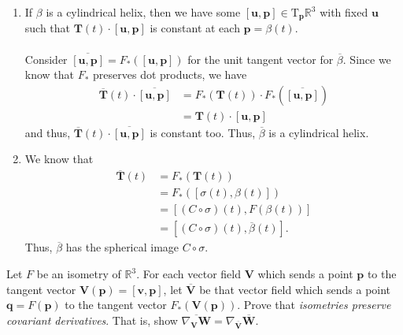\documentclass[12 pt, letterpaper]{hmcpset}
\begin{document}
\begin{solution}
	\begin{enumerate}
		\item If $\beta$ is a cylindrical helix, then we have some $[\mathbf{u}, \mathbf{p}] \in \mathrm{T}_{\mathbf{p}}\mathbb{R}^{3}$ with fixed $\mathbf{u}$ such that $\mathbf{T}(t) \cdot [\mathbf{u}, \mathbf{p}]$ is constant at each $\mathbf{p} = \beta(t)$. \\\\
			Consider $\overline{[\mathbf{u}, \mathbf{p}]} = F_{*}([\mathbf{u}, \mathbf{p}])$ for the unit tangent vector for $\overline{\beta}$. Since we know that $F_{*}$ preserves dot products, we have
			\[
				\begin{split}
					\overline{\mathbf{T}}(t) \cdot \overline{[\mathbf{u}, \mathbf{p}]} & = F_{*}(\mathbf{T}(t)) \cdot F_{*}(\overline{[\mathbf{u}, \mathbf{p}]}) \\
													   & = \mathbf{T}(t) \cdot [\mathbf{u}, \mathbf{p}]
				\end{split}
			\]
			and thus, $\overline{\mathbf{T}}(t) \cdot \overline{[\mathbf{u}, \mathbf{p}]}$ is constant too. Thus, $\overline{\beta}$ is a cylindrical helix.
		\item We know that
			\[
				\begin{split}
					\overline{\mathbf{T}}(t) & = F_{*}(\mathbf{T}(t)) \\
								 & = F_{*}([\sigma(t), \beta(t)]) \\
								 & = [(C \circ \sigma)(t), F(\beta(t))] \\
								 & = [(C \circ \sigma)(t), \overline{\beta}(t)].
				\end{split}
			\]
			Thus, $\overline{\beta}$ has the spherical image $C \circ \sigma$.
	\end{enumerate}
\end{solution}

\pagebreak

\begin{problem}[Problem 5.]
	Let $F$ be an isometry of $\mathbb{R}^{3}$. For each vector field $\mathbf{V}$ which sends a point $\mathbf{p}$ to the tangent vector $\mathbf{V}(\mathbf{p}) = [\mathbf{v}, \mathbf{p}]$, let $\overline{\mathbf{V}}$ be that vector field which sends a point $\mathbf{q} = F(\mathbf{p})$ to the tangent vector $F_{*}(\mathbf{V}(\mathbf{p}))$. Prove that \textit{isometries preserve covariant derivatives}. That is, show $\overline{\nabla_{\mathbf{V}} \mathbf{W}} = \nabla_{\overline{\mathbf{V}}} \overline{\mathbf{W}}$.
\end{problem}
\end{document}
